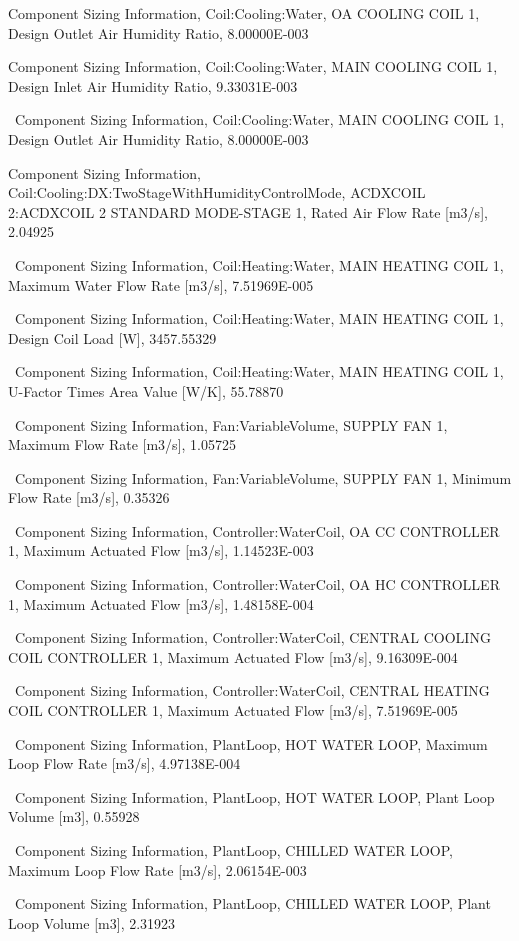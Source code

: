 Component Sizing Information, Coil:Cooling:Water, OA COOLING COIL 1, Design Outlet Air Humidity Ratio, 8.00000E-003

Component Sizing Information, Coil:Cooling:Water, MAIN COOLING COIL 1, Design Inlet Air Humidity Ratio, 9.33031E-003

~Component Sizing Information, Coil:Cooling:Water, MAIN COOLING COIL 1, Design Outlet Air Humidity Ratio, 8.00000E-003

Component Sizing Information, Coil:Cooling:DX:TwoStageWithHumidityControlMode, ACDXCOIL 2:ACDXCOIL 2 STANDARD MODE-STAGE 1, Rated Air Flow Rate {[}m3/s{]}, 2.04925

~Component Sizing Information, Coil:Heating:Water, MAIN HEATING COIL 1, Maximum Water Flow Rate {[}m3/s{]}, 7.51969E-005

~Component Sizing Information, Coil:Heating:Water, MAIN HEATING COIL 1, Design Coil Load {[}W{]}, 3457.55329

~Component Sizing Information, Coil:Heating:Water, MAIN HEATING COIL 1, U-Factor Times Area Value {[}W/K{]}, 55.78870

~Component Sizing Information, Fan:VariableVolume, SUPPLY FAN 1, Maximum Flow Rate {[}m3/s{]}, 1.05725

~Component Sizing Information, Fan:VariableVolume, SUPPLY FAN 1, Minimum Flow Rate {[}m3/s{]}, 0.35326

~Component Sizing Information, Controller:WaterCoil, OA CC CONTROLLER 1, Maximum Actuated Flow {[}m3/s{]}, 1.14523E-003

~Component Sizing Information, Controller:WaterCoil, OA HC CONTROLLER 1, Maximum Actuated Flow {[}m3/s{]}, 1.48158E-004

~Component Sizing Information, Controller:WaterCoil, CENTRAL COOLING COIL CONTROLLER 1, Maximum Actuated Flow {[}m3/s{]}, 9.16309E-004

~Component Sizing Information, Controller:WaterCoil, CENTRAL HEATING COIL CONTROLLER 1, Maximum Actuated Flow {[}m3/s{]}, 7.51969E-005

~Component Sizing Information, PlantLoop, HOT WATER LOOP, Maximum Loop Flow Rate {[}m3/s{]}, 4.97138E-004

~Component Sizing Information, PlantLoop, HOT WATER LOOP, Plant Loop Volume {[}m3{]}, 0.55928

~Component Sizing Information, PlantLoop, CHILLED WATER LOOP, Maximum Loop Flow Rate {[}m3/s{]}, 2.06154E-003

~Component Sizing Information, PlantLoop, CHILLED WATER LOOP, Plant Loop Volume {[}m3{]}, 2.31923

